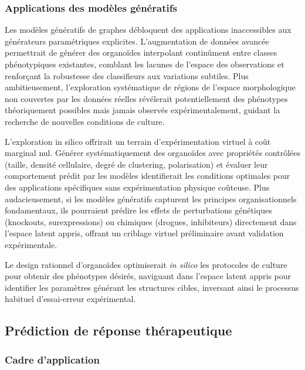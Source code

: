 \subsubsection{Applications des modèles génératifs}

Les modèles génératifs de graphes débloquent des applications inaccessibles aux générateurs paramétriques explicites. L'augmentation de données avancée permettrait de générer des organoïdes interpolant continûment entre classes phénotypiques existantes, comblant les lacunes de l'espace des observations et renforçant la robustesse des classifieurs aux variations subtiles. Plus ambitieusement, l'exploration systématique de régions de l'espace morphologique non couvertes par les données réelles révélerait potentiellement des phénotypes théoriquement possibles mais jamais observés expérimentalement, guidant la recherche de nouvelles conditions de culture.

L'exploration in silico offrirait un terrain d'expérimentation virtuel à coût marginal nul. Générer systématiquement des organoïdes avec propriétés contrôlées (taille, densité cellulaire, degré de clustering, polarisation) et évaluer leur comportement prédit par les modèles identifierait les conditions optimales pour des applications spécifiques sans expérimentation physique coûteuse. Plus audacieusement, si les modèles génératifs capturent les principes organisationnels fondamentaux, ils pourraient prédire les effets de perturbations génétiques (knockouts, surexpressions) ou chimiques (drogues, inhibiteurs) directement dans l'espace latent appris, offrant un criblage virtuel préliminaire avant validation expérimentale.

Le design rationnel d'organoïdes optimiserait \textit{in silico} les protocoles de culture pour obtenir des phénotypes désirés, naviguant dans l'espace latent appris pour identifier les paramètres générant les structures cibles, inversant ainsi le processus habituel d'essai-erreur expérimental.

\subsection{Prédiction de réponse thérapeutique}

\subsubsection{Cadre d'application}

